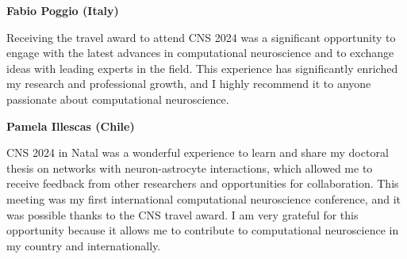 \noindent{}\textbf{Fabio Poggio (Italy)}
\begin{displayquote}
Receiving the travel award to attend CNS 2024 was a significant opportunity to engage with the latest advances in computational neuroscience and to exchange ideas with leading experts in the field. This experience has significantly enriched my research and professional growth, and I highly recommend it to anyone passionate about computational neuroscience.
\end{displayquote}

\noindent{}\textbf{Pamela Illescas (Chile)}
\begin{displayquote}
CNS 2024 in Natal was a wonderful experience to learn and share my doctoral thesis on networks with neuron-astrocyte interactions, which allowed
me to receive feedback from other researchers and opportunities for collaboration. This meeting was my first international computational neuroscience conference, and it was possible thanks to the CNS travel award. I am very grateful for this opportunity because it allows me to contribute to computational neuroscience in my country and internationally.
\end{displayquote}
